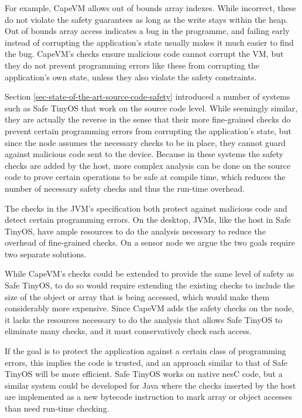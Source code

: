 For example, CapeVM allows out of bounds array indexes. While incorrect, these do not violate the safety guarantees as long as the write stays within the heap. Out of bounds array access indicates a bug in the programme, and failing early instead of corrupting the application's state usually makes it much easier to find the bug. CapeVM's checks ensure malicious code cannot corrupt the VM, but they do not prevent programming errors like these from corrupting the application's own state, unless they also violate the safety constraints.

Section \ref{sec-state-of-the-art-source-code-safety} introduced a number of systems such as Safe TinyOS \cite{Cooprider:2007ub} that work on the source code level. While seemingly similar, they are actually the reverse in the sense that their more fine-grained checks do prevent certain programming errors from corrupting the application's state, but since the node assumes the necessary checks to be in place, they cannot guard against malicious code sent to the device. Because in these systems the safety checks are added by the host, more complex analysis can be done on the source code to prove certain operations to be safe at compile time, which reduces the number of necessary safety checks and thus the run-time overhead.

The checks in the JVM's specification both protect against malicious code and detect certain programming errors. On the desktop, JVMs, like the host in Safe TinyOS, have ample resources to do the analysis necessary to reduce the overhead of fine-grained checks. On a sensor node we argue the two goals require two separate solutions.

While CapeVM's checks could be extended to provide the same level of safety as Safe TinyOS, to do so would require extending the existing checks to include the size of the object or array that is being accessed, which would make them considerably more expensive. Since CapeVM adds the safety checks on the node, it lacks the resources necessary to do the analysis that allows Safe TinyOS to eliminate many checks, and it must conservatively check each access.

If the goal is to protect the application against a certain class of programming errors, this implies the code is trusted, and an approach similar to that of Safe TinyOS will be more efficient. Safe TinyOS works on native nesC code, but a similar system could be developed for Java where the checks inserted by the host are implemented as a new bytecode instruction to mark array or object accesses than need run-time checking.


